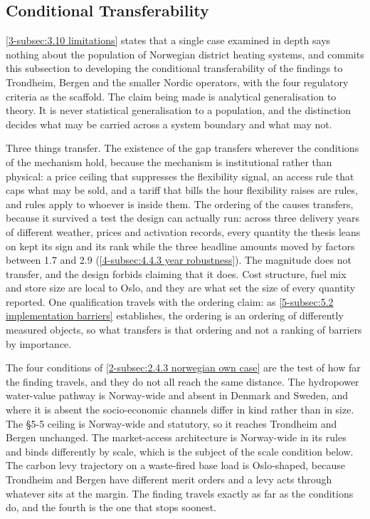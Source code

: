 \subsection{Conditional Transferability}
\label{5-subsec:5.4 transferability}

\autoref{3-subsec:3.10 limitations} states that a single case examined in depth says nothing about the population of Norwegian district heating systems, and commits this subsection to developing the conditional transferability of the findings to Trondheim, Bergen and the smaller Nordic operators, with the four regulatory criteria as the scaffold. The claim being made is analytical generalisation to theory. It is never statistical generalisation to a population, and the distinction decides what may be carried across a system boundary and what may not.

Three things transfer. The existence of the gap transfers wherever the conditions of the mechanism hold, because the mechanism is institutional rather than physical: a price ceiling that suppresses the flexibility signal, an access rule that caps what may be sold, and a tariff that bills the hour flexibility raises are rules, and rules apply to whoever is inside them. The ordering of the causes transfers, because it survived a test the design can actually run: across three delivery years of different weather, prices and activation records, every quantity the thesis leans on kept its sign and its rank while the three headline amounts moved by factors between 1.7 and 2.9 (\autoref{4-subsec:4.4.3 year robustness}). The magnitude does not transfer, and the design forbids claiming that it does. Cost structure, fuel mix and store size are local to Oslo, and they are what set the size of every quantity reported. One qualification travels with the ordering claim: as \autoref{5-subsec:5.2 implementation barriers} establishes, the ordering is an ordering of differently measured objects, so what transfers is that ordering and not a ranking of barriers by importance.

The four conditions of \autoref{2-subsec:2.4.3 norwegian own case} are the test of how far the finding travels, and they do not all reach the same distance. The hydropower water-value pathway is Norway-wide and absent in Denmark and Sweden, and where it is absent the socio-economic channels differ in kind rather than in size. The \S5-5 ceiling is Norway-wide and statutory, so it reaches Trondheim and Bergen unchanged. The market-access architecture is Norway-wide in its rules and binds differently by scale, which is the subject of the scale condition below. The carbon levy trajectory on a waste-fired base load is Oslo-shaped, because Trondheim and Bergen have different merit orders and a levy acts through whatever sits at the margin. The finding travels exactly as far as the conditions do, and the fourth is the one that stops soonest.

